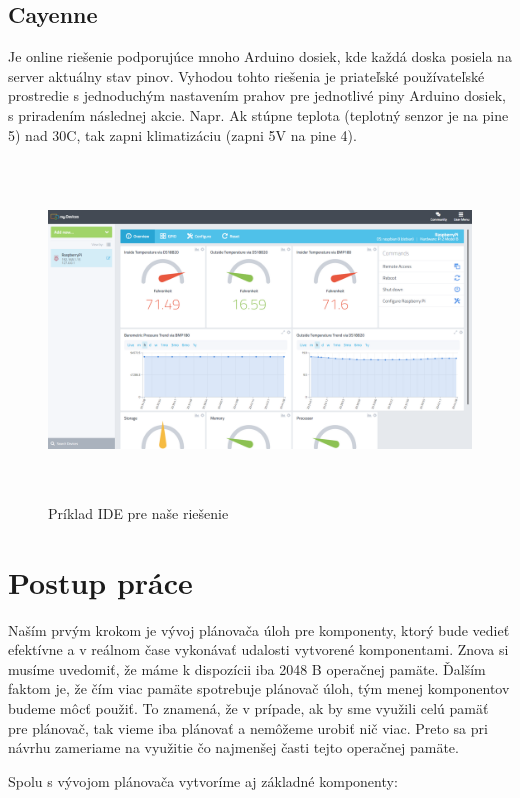 \section{Cayenne}

Je online riešenie podporujúce mnoho Arduino dosiek, kde každá doska posiela na server aktuálny stav pinov. Vyhodou tohto riešenia je priateľské používateľské prostredie s jednoduchým nastavením prahov pre jednotlivé piny Arduino dosiek, s priradením následnej akcie. Napr. Ak stúpne teplota (teplotný senzor je na pine 5) nad 30C, tak zapni klimatizáciu (zapni 5V na pine 4).

\begin{figure}[H]
	\begin{center}
		\includegraphics[height=9cm]{pics/cayenne.png}
		\caption{Príklad IDE pre naše riešenie}
	\end{center}
\end{figure}


\chapter{Postup práce}
Naším prvým krokom je vývoj plánovača úloh pre komponenty, ktorý bude vedieť efektívne a v reálnom čase vykonávať udalosti vytvorené komponentami. Znova si musíme uvedomiť, že máme k dispozícii iba 2048 B operačnej pamäte. Ďalším faktom je, že čím viac pamäte spotrebuje plánovač úloh, tým menej komponentov budeme môcť použiť. To znamená, že v prípade, ak by sme využili celú pamäť pre plánovač, tak vieme iba plánovať a nemôžeme urobiť nič viac. Preto sa pri návrhu zameriame na využitie čo najmenšej časti tejto operačnej pamäte.

Spolu s vývojom plánovača vytvoríme aj základné komponenty:

